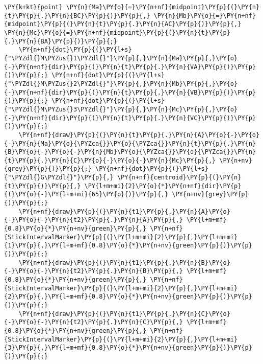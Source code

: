 \begin{Verbatim}[commandchars=\\\{\}]
    \PY{k+kt}{point} \PY{n}{Ma}\PY{o}{=}\PY{n+nf}{midpoint}\PY{p}{(}\PY{n}{t}\PY{p}{.}\PY{n}{BC}\PY{p}{)}\PY{p}{,} \PY{n}{Mb}\PY{o}{=}\PY{n+nf}{midpoint}\PY{p}{(}\PY{n}{t}\PY{p}{.}\PY{n}{AC}\PY{p}{)}\PY{p}{,} \PY{n}{Mc}\PY{o}{=}\PY{n+nf}{midpoint}\PY{p}{(}\PY{n}{t}\PY{p}{.}\PY{n}{BA}\PY{p}{)}\PY{p}{;}
    \PY{n+nf}{dot}\PY{p}{(}\PY{l+s}{"\PYZdl{}M\PYZus{}1\PYZdl{}"}\PY{p}{,}\PY{n}{Ma}\PY{p}{,}\PY{o}{-}\PY{n+nf}{dir}\PY{p}{(}\PY{n}{t}\PY{p}{.}\PY{n}{VA}\PY{p}{)}\PY{p}{)}\PY{p}{;} \PY{n+nf}{dot}\PY{p}{(}\PY{l+s}{"\PYZdl{}M\PYZus{}2\PYZdl{}"}\PY{p}{,}\PY{n}{Mb}\PY{p}{,}\PY{o}{-}\PY{n+nf}{dir}\PY{p}{(}\PY{n}{t}\PY{p}{.}\PY{n}{VB}\PY{p}{)}\PY{p}{)}\PY{p}{;} \PY{n+nf}{dot}\PY{p}{(}\PY{l+s}{"\PYZdl{}M\PYZus{}3\PYZdl{}"}\PY{p}{,}\PY{n}{Mc}\PY{p}{,}\PY{o}{-}\PY{n+nf}{dir}\PY{p}{(}\PY{n}{t}\PY{p}{.}\PY{n}{VC}\PY{p}{)}\PY{p}{)}\PY{p}{;}
    \PY{n+nf}{draw}\PY{p}{(}\PY{n}{t}\PY{p}{.}\PY{n}{A}\PY{o}{-}\PY{o}{-}\PY{n}{Ma}\PY{o}{\PYZca{}}\PY{o}{\PYZca{}}\PY{n}{t}\PY{p}{.}\PY{n}{B}\PY{o}{-}\PY{o}{-}\PY{n}{Mb}\PY{o}{\PYZca{}}\PY{o}{\PYZca{}}\PY{n}{t}\PY{p}{.}\PY{n}{C}\PY{o}{-}\PY{o}{-}\PY{n}{Mc}\PY{p}{,} \PY{n+nv}{grey}\PY{p}{)}\PY{p}{;} \PY{n+nf}{dot}\PY{p}{(}\PY{l+s}{"\PYZdl{}G\PYZdl{}"}\PY{p}{,} \PY{n+nf}{centroid}\PY{p}{(}\PY{n}{t}\PY{p}{)}\PY{p}{,} \PY{l+m+mi}{2}\PY{o}{*}\PY{n+nf}{dir}\PY{p}{(}\PY{o}{-}\PY{l+m+mi}{65}\PY{p}{)}\PY{p}{,} \PY{n+nv}{grey}\PY{p}{)}\PY{p}{;}
    \PY{n+nf}{draw}\PY{p}{(}\PY{n}{t1}\PY{p}{.}\PY{n}{A}\PY{o}{-}\PY{o}{-}\PY{n}{t2}\PY{p}{.}\PY{n}{A}\PY{p}{,} \PY{l+m+mf}{0.8}\PY{o}{*}\PY{n+nv}{green}\PY{p}{,} \PY{n+nf}{StickIntervalMarker}\PY{p}{(}\PY{l+m+mi}{2}\PY{p}{,}\PY{l+m+mi}{1}\PY{p}{,}\PY{l+m+mf}{0.8}\PY{o}{*}\PY{n+nv}{green}\PY{p}{)}\PY{p}{)}\PY{p}{;}
    \PY{n+nf}{draw}\PY{p}{(}\PY{n}{t1}\PY{p}{.}\PY{n}{B}\PY{o}{-}\PY{o}{-}\PY{n}{t2}\PY{p}{.}\PY{n}{B}\PY{p}{,} \PY{l+m+mf}{0.8}\PY{o}{*}\PY{n+nv}{green}\PY{p}{,} \PY{n+nf}{StickIntervalMarker}\PY{p}{(}\PY{l+m+mi}{2}\PY{p}{,}\PY{l+m+mi}{2}\PY{p}{,}\PY{l+m+mf}{0.8}\PY{o}{*}\PY{n+nv}{green}\PY{p}{)}\PY{p}{)}\PY{p}{;}
    \PY{n+nf}{draw}\PY{p}{(}\PY{n}{t1}\PY{p}{.}\PY{n}{C}\PY{o}{-}\PY{o}{-}\PY{n}{t2}\PY{p}{.}\PY{n}{C}\PY{p}{,} \PY{l+m+mf}{0.8}\PY{o}{*}\PY{n+nv}{green}\PY{p}{,} \PY{n+nf}{StickIntervalMarker}\PY{p}{(}\PY{l+m+mi}{2}\PY{p}{,}\PY{l+m+mi}{3}\PY{p}{,}\PY{l+m+mf}{0.8}\PY{o}{*}\PY{n+nv}{green}\PY{p}{)}\PY{p}{)}\PY{p}{;}
\end{Verbatim}
